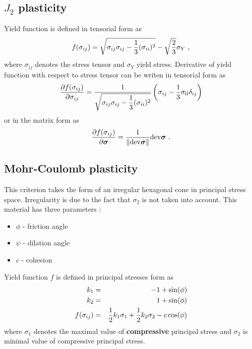 \subsection{$J_2$ plasticity}
\label{sectj2flowmodel}

Yield function is defined in tensorial form as
\begin{equation}
f(\sigma_{ij}) = \sqrt{\sigma_{ij}\sigma_{ij}-\mbox{$\displaystyle\frac{1}{3}$}(\sigma_{ii})^2} - \sqrt{\mbox{$\displaystyle\frac{2}{3}$}}\sigma_Y\ ,
\end{equation}
where $\sigma_{ij}$ denotes the stress tensor and $\sigma_Y$ yield stress.
Derivative of yield function with respect to stress tensor can be writen in tensorial form as
\begin{equation}
\mbox{$\displaystyle\frac{\partial{f(\sigma_{ij})}}{\partial{\sigma_{ij}}}$} = \mbox{$\displaystyle\frac{1}{\sqrt{\sigma_{ij}\sigma_{ij}-\mbox{$\displaystyle\frac{1}{3}$}(\sigma_{ii})^2}}$}
\left(\sigma_{ij}-{1 \over 3}\sigma_{ll}\delta_{ij}\right)
\end{equation}
or in the matrix form as
\begin{equation}
\mbox{$\displaystyle\frac{\partial{f(\sigma_{ij})}}{\partial{\mbox{\boldmath$\sigma$}}}$} = \mbox{$\displaystyle\frac{1}{\|{\rm dev}\mbox{\boldmath$\sigma$}\|}$}{\rm dev}\mbox{\boldmath$\sigma$}\ .
\end{equation}


\subsection{Mohr-Coulomb plasticity}
\label{sectmohrcplasmodel}

This criterion takes the form of an irregular hexagonal cone in principal stress space. Irregularity is  due to the
fact that $\sigma_2$ is not taken into account. This material has three parameters :
\begin {itemize}
\item $\phi$ - friction angle 
\item $\psi$ - dilation angle 
\item $c$ - cohesion 
\end {itemize}

Yield function $f$ is defined in principal stresses form as
\begin{eqnarray}
k_1 &=& -1+\sin(\phi) \\
k_2 &=& 1+\sin(\phi) \\
f(\sigma_{ij}) &=& \mbox{$\displaystyle\frac{1}{2}$}k_1\sigma_1+ \mbox{$\displaystyle\frac{1}{2}$}k_2\sigma_2-c\cos(\phi)
\end{eqnarray}
where $\sigma_1$ denotes the maximal value of {\bf compressive} principal stress and $\sigma_2$ is minimal value of
compressive principal stress.

